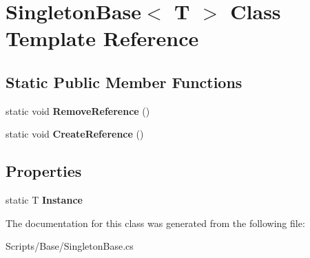 \hypertarget{class_singleton_base}{}\section{Singleton\+Base$<$ T $>$ Class Template Reference}
\label{class_singleton_base}
\subsection*{Static Public Member Functions}
\begin{DoxyCompactItemize}
\item 
static void {\bfseries Remove\+Reference} ()\hypertarget{class_singleton_base_a315f2c75cec6af37d9db6ead590b9bf9}{}\label{class_singleton_base_a315f2c75cec6af37d9db6ead590b9bf9}

\item 
static void {\bfseries Create\+Reference} ()\hypertarget{class_singleton_base_a15797370a65507e0a722da0b57b3f4b2}{}\label{class_singleton_base_a15797370a65507e0a722da0b57b3f4b2}

\end{DoxyCompactItemize}
\subsection*{Properties}
\begin{DoxyCompactItemize}
\item 
static T {\bfseries Instance}\hypertarget{class_singleton_base_aa726d096ab07668698600ad2a6c1744a}{}\label{class_singleton_base_aa726d096ab07668698600ad2a6c1744a}

\end{DoxyCompactItemize}


The documentation for this class was generated from the following file\+:\begin{DoxyCompactItemize}
\item 
Scripts/\+Base/Singleton\+Base.\+cs\end{DoxyCompactItemize}
